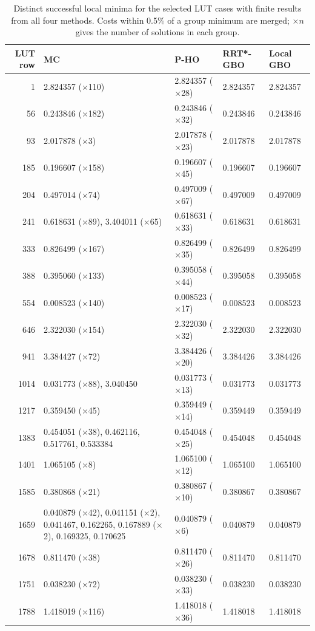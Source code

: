 \begin{table}[ht]
\centering
\caption{Distinct successful local minima for the selected \ac{LUT} cases with finite results from all four methods. Costs within 0.5\% of a group minimum are merged; $\times n$ gives the number of solutions in each group.}
\label{tab:100-global-local-minima-by-case}
\small
\begin{tabular}{r p{} p{} p{} p{}}
\hline
\ac{LUT} row & MC & P-HO & RRT*-GBO & Local GBO \\
\hline
1 & 2.824357 ($\times$110) & 2.824357 ($\times$28) & 2.824357 & 2.824357 \\
56 & 0.243846 ($\times$182) & 0.243846 ($\times$32) & 0.243846 & 0.243846 \\
93 & 2.017878 ($\times$3) & 2.017878 ($\times$23) & 2.017878 & 2.017878 \\
185 & 0.196607 ($\times$158) & 0.196607 ($\times$45) & 0.196607 & 0.196607 \\
204 & 0.497014 ($\times$74) & 0.497009 ($\times$67) & 0.497009 & 0.497009 \\
241 & 0.618631 ($\times$89), 3.404011 ($\times$65) & 0.618631 ($\times$33) & 0.618631 & 0.618631 \\
333 & 0.826499 ($\times$167) & 0.826499 ($\times$35) & 0.826499 & 0.826499 \\
388 & 0.395060 ($\times$133) & 0.395058 ($\times$44) & 0.395058 & 0.395058 \\
554 & 0.008523 ($\times$140) & 0.008523 ($\times$17) & 0.008523 & 0.008523 \\
646 & 2.322030 ($\times$154) & 2.322030 ($\times$32) & 2.322030 & 2.322030 \\
941 & 3.384427 ($\times$72) & 3.384426 ($\times$20) & 3.384426 & 3.384426 \\
1014 & 0.031773 ($\times$88), 3.040450 & 0.031773 ($\times$13) & 0.031773 & 0.031773 \\
1217 & 0.359450 ($\times$45) & 0.359449 ($\times$14) & 0.359449 & 0.359449 \\
1383 & 0.454051 ($\times$38), 0.462116, 0.517761, 0.533384 & 0.454048 ($\times$25) & 0.454048 & 0.454048 \\
1401 & 1.065105 ($\times$8) & 1.065100 ($\times$12) & 1.065100 & 1.065100 \\
1585 & 0.380868 ($\times$21) & 0.380867 ($\times$10) & 0.380867 & 0.380867 \\
1659 & 0.040879 ($\times$42), 0.041151 ($\times$2), 0.041467, 0.162265, 0.167889 ($\times$2), 0.169325, 0.170625 & 0.040879 ($\times$6) & 0.040879 & 0.040879 \\
1678 & 0.811470 ($\times$38) & 0.811470 ($\times$26) & 0.811470 & 0.811470 \\
1751 & 0.038230 ($\times$72) & 0.038230 ($\times$33) & 0.038230 & 0.038230 \\
1788 & 1.418019 ($\times$116) & 1.418018 ($\times$36) & 1.418018 & 1.418018 \\
\hline
\end{tabular}
\end{table}

